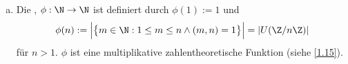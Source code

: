 \begin{nt}
\begin{enumerate}[a)]
\begin{proof}
				\begin{segnb}{\ProofImplication}
					Es gilt $n,m \divs a - b$.
					Wegen $\kgV(n,m) = \f{nm}{\ggT(n,m)} = nm$ daher auch $nm \divs a - b$, also $a \equiv b \bmod nm$.
				\end{segnb}
				\begin{segnb}{\ProofImplication*}
					Wegen $nm \divs a - b$ ist $n,m \divs nm \divs a - b$, also $a \equiv b \bmod n,m$.
				\end{segnb}
			\end{proof}
		\item
			Die , $\phi: \N \to \N$ ist definiert durch $\phi(1) := 1$ und
			\[
				\phi(n)
				:= \Big| \big\{m \in \N : 1 \le m \le n \land (m,n) = 1 \big\} \Big|
				= |U(\Z / n\Z)|
			\]
			für $n > 1$.
			$\phi$ ist eine multiplikative zahlentheoretische Funktion (siehe \ref{1.15}).
	\end{enumerate}
\end{nt}


